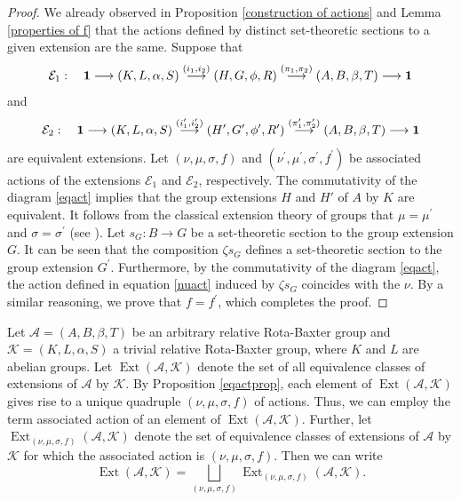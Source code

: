 \documentclass[11pt]{amsart}
\theoremstyle{thrm}
\theoremstyle{plain}
\theoremstyle{definition}
\newcommand{\Ext}{\operatorname{Ext} }
\numberwithin{equation}{section}
\begin{document}
\begin{proof}
We already observed in Proposition \ref{construction of actions} and Lemma \ref{properties of f} that the actions defined by distinct  set-theoretic  sections to a given extension are the same.
 Suppose that $$\mathcal{E}_1 : \quad {\bf 1} \longrightarrow (K,L,\alpha,S ) \stackrel{(i_1, i_2)}{\longrightarrow}  (H,G, \phi, R) \stackrel{(\pi_1, \pi_2)}{\longrightarrow} (A,B, \beta, T) \longrightarrow {\bf 1}$$
	and $$\mathcal{E}_2 : \quad {\bf 1} \longrightarrow (K,L,\alpha,S ) \stackrel{(i^\prime_1, i^\prime_2)}{\longrightarrow}  (H^\prime,G^\prime, \phi^\prime, R^\prime) \stackrel{(\pi^\prime_1, \pi^\prime_2)}{\longrightarrow} (A,B, \beta, T) \longrightarrow {\bf 1}$$
are equivalent extensions. Let $(\nu, \mu, \sigma, f)$ and $(\nu^\prime, \mu^\prime, \sigma^\prime, f^\prime)$ be associated actions of the extensions $\mathcal{E}_1$ and $\mathcal{E}_2$, respectively. The commutativity of the diagram \eqref{eqact} implies that the group extensions $H$ and $H'$ of $A$ by $K$ are equivalent. It follows from the classical extension theory of groups that $\mu= \mu^\prime$ and $\sigma=\sigma^\prime$ (see \cite{MR0672956}). Let  $s_G: B \rightarrow G$ be a set-theoretic section to the group extension $G$. It can be seen that the composition $\zeta s_G$  defines a set-theoretic section to the group extension $G^\prime$. Furthermore, by  the commutativity of the diagram \eqref{eqact}, the action defined in equation \eqref{nuact} induced by $\zeta s_G$ coincides with the $\nu$.  By a similar reasoning, we prove that $f=f^\prime$, which completes the proof.
\end{proof}

Let $\mathcal{A}= (A,B, \beta, T)$ be an arbitrary relative Rota-Baxter group and $\mathcal{K}=  (K,L,\alpha,S )$ a trivial relative Rota-Baxter group, where $K$ and $L$ are abelian groups. Let $\Ext(\mathcal{A}, \mathcal{K})$ denote the set of all equivalence classes of extensions of $\mathcal{A}$ by $\mathcal{K}$. By Proposition \ref{eqactprop}, each element of  $\Ext(\mathcal{A}, \mathcal{K})$ gives rise to a unique quadruple $(\nu, \mu, \sigma,f)$ of actions. Thus, we can employ the term associated action of an element of $\Ext(\mathcal{A}, \mathcal{K})$. Further, let  $\Ext_{(\nu, \mu, \sigma, f)}(\mathcal{A}, \mathcal{K})$ denote the set of equivalence classes of extensions of $\mathcal{A}$ by $\mathcal{K}$ for which the associated action is $(\nu, \mu, \sigma, f)$. Then we can write
$$\Ext(\mathcal{A}, \mathcal{K})=\bigsqcup_{(\nu, \mu, \sigma, f)} \Ext_{(\nu, \mu, \sigma, f)}(\mathcal{A}, \mathcal{K}).$$
\end{document}
